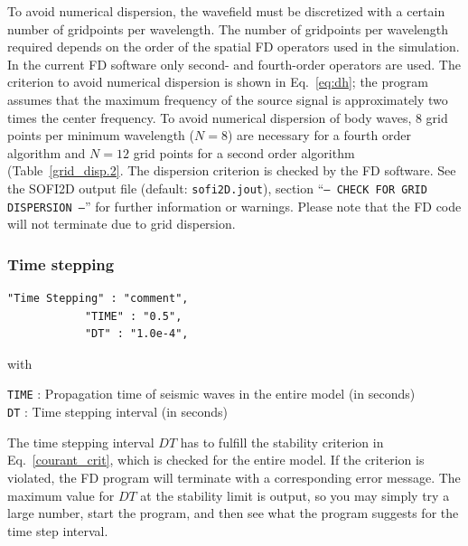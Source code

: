 To avoid numerical dispersion, the wavefield must be discretized with a certain number of gridpoints per wavelength. The number of gridpoints per wavelength required depends on the order of the spatial FD operators used in the simulation. In the current FD software only second- and fourth-order operators are used. The criterion to avoid numerical dispersion is shown in Eq.~\ref{eq:dh}; the program assumes that the maximum frequency of the source signal is approximately two times the center frequency. To avoid numerical dispersion of body waves, 8 grid points per minimum wavelength ($N=8$) are necessary for a fourth order algorithm and $N=12$ grid points for a second order algorithm (Table~\ref{grid_disp.2}. The dispersion criterion is checked by the FD software. See the SOFI2D output file (default: \texttt{sofi2D.jout}), section \enquote{\texttt{--- CHECK FOR GRID DISPERSION ---}} for further information or warnings. Please note that the FD code will not terminate due to grid dispersion.

\subsubsection{Time stepping}
\begin{verbatim}
"Time Stepping" : "comment",
			"TIME" : "0.5",
			"DT" : "1.0e-4",
\end{verbatim}

with

\texttt{TIME} : Propagation time of seismic waves in the entire model (in seconds)\\
\texttt{DT} : Time stepping interval (in seconds)

The time stepping interval $DT$ has to fulfill the stability criterion in Eq.~\ref{courant_crit}, which is checked for the entire model. If the criterion is violated, the FD program will terminate with a corresponding error message. The maximum value for $DT$ at the stability limit is output, so you may simply try a large number, start the program, and then see what the program suggests for the time step interval.

